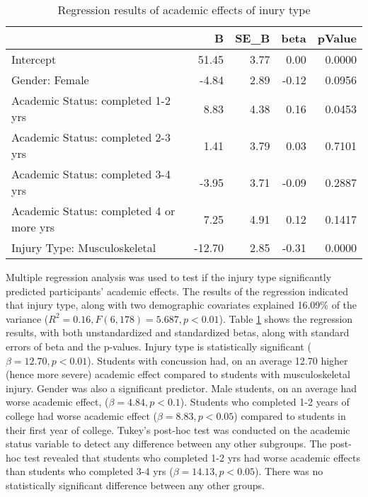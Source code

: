\documentclass[12]{article}
\begin{document}
\begin{table}[H]
\centering
\begin{tabular}{lrrrr}
  \hline
 & B & SE\_B & beta & pValue \\ 
  \hline
Intercept & 51.45 & 3.77 & 0.00 & 0.0000 \\ 
  Gender: Female & -4.84 & 2.89 & -0.12 & 0.0956 \\ 
  Academic Status: completed 1-2 yrs & 8.83 & 4.38 & 0.16 & 0.0453 \\ 
  Academic Status: completed 2-3 yrs & 1.41 & 3.79 & 0.03 & 0.7101 \\ 
  Academic Status: completed 3-4 yrs & -3.95 & 3.71 & -0.09 & 0.2887 \\ 
  Academic Status: completed 4 or more yrs & 7.25 & 4.91 & 0.12 & 0.1417 \\ 
  Injury Type: Musculoskeletal & -12.70 & 2.85 & -0.31 & 0.0000 \\ 
   \hline
\end{tabular}
\caption{Regression results of academic effects of inury type} 
\label{tab:Tab2Reg}
\end{table}
Multiple regression analysis was used to test if the injury type significantly predicted participants' academic effects. The results of the regression indicated that injury type, along with two demographic  covariates explained 16.09\% of the variance ($R^2=0.16, F(6,178) = 5.687, p < 0.01$). Table \ref{tab:Tab2Reg} shows the regression results, with both unstandardized and standardized betas, along with standard errors of beta and the p-values. Injury type is statistically significant ($\beta = 12.70, p < 0.01$). Students with concussion had, on an average 12.70 higher (hence more severe) academic effect compared to students with musculoskeletal injury. Gender was also a significant predictor. Male students, on an average had worse academic effect, ($\beta = 4.84, p < 0.1$). Students who completed 1-2 years of college had worse academic effect ($\beta = 8.83, p < 0.05$) compared to students in their first year of college. Tukey's post-hoc test was conducted on the academic status variable to detect any difference between any other subgroups. The post-hoc test revealed that students who completed 1-2 yrs had worse academic effects than students who completed 3-4 yrs ($\beta = 14.13, p < 0.05$). There was no statistically significant difference between any other groups.  
\end{document}
